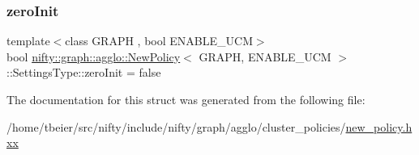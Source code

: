 \mbox{\label{structnifty_1_1graph_1_1agglo_1_1NewPolicy_1_1SettingsType_a7fea993c8c7ef90dbd52944563dcb63d}} 
\subsubsection{\texorpdfstring{zero\+Init}{zeroInit}}
{\footnotesize\ttfamily template$<$class G\+R\+A\+PH , bool E\+N\+A\+B\+L\+E\+\_\+\+U\+CM$>$ \\
bool \hyperlink{classnifty_1_1graph_1_1agglo_1_1NewPolicy}{nifty\+::graph\+::agglo\+::\+New\+Policy}$<$ G\+R\+A\+PH, E\+N\+A\+B\+L\+E\+\_\+\+U\+CM $>$\+::Settings\+Type\+::zero\+Init = false}



The documentation for this struct was generated from the following file\+:\begin{DoxyCompactItemize}
\item 
/home/tbeier/src/nifty/include/nifty/graph/agglo/cluster\+\_\+policies/\hyperlink{new__policy_8hxx}{new\+\_\+policy.\+hxx}\end{DoxyCompactItemize}
